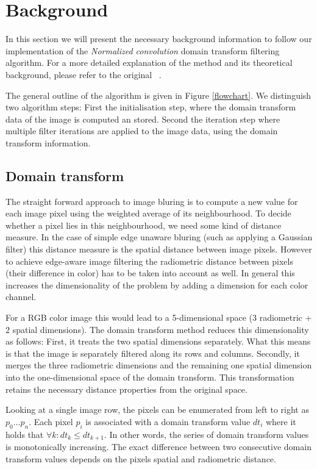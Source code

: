 \section{Background}\label{sec:background}

In this section we will present the necessary background information to follow our implementation of the \textit{Normalized convolution} domain transform filtering algorithm. For a more detailed explanation of the method and its theoretical background, please refer to the original ~\cite{GastalOliveira2011DomainTransform}.

The general outline of the algorithm is given in Figure \ref{flowchart}. We distinguish two algorithm steps: First the initialisation step, where the domain transform data of the image is computed an stored. Second the iteration step where multiple filter iterations are applied to the image data, using the domain transform information.

\subsection{Domain transform}

The straight forward approach to image bluring is to compute a new value for each image pixel using the weighted average of its neighbourhood. To decide whether a pixel lies in this neighbourhood, we need some kind of distance measure. In the case of simple edge unaware bluring (such as applying a Gaussian filter) this distance measure is the spatial distance between image pixels. However to achieve edge-aware image filtering the radiometric distance between pixels (their difference in color) has to be taken into account as well.
In general this increases the dimensionality of the problem by adding a dimension for each color channel.

For a RGB color image this would lead to a 5-dimensional space (3 radiometric + 2 spatial dimensions). The domain transform method reduces this dimensionality as follows:
First, it treats the two spatial dimensions separately. What this means is that the image is separately filtered along its rows and columns. Secondly, it merges the three radiometric dimensions and the remaining one spatial dimension into the one-dimensional space of the domain transform. This transformation retains the necessary distance properties from the original space.

Looking at a single image row, the pixels can be enumerated from left to right as $ p_0 \dots p_n$. Each pixel $p_i$ is associated with a domain transform value $dt_i$ where it holds that $\forall k : dt_k \leq dt_{k+1}$. In other words, the series of domain transform values is monotonically increasing. The exact difference between two consecutive domain transform values depends on the pixels spatial and radiometric distance.

